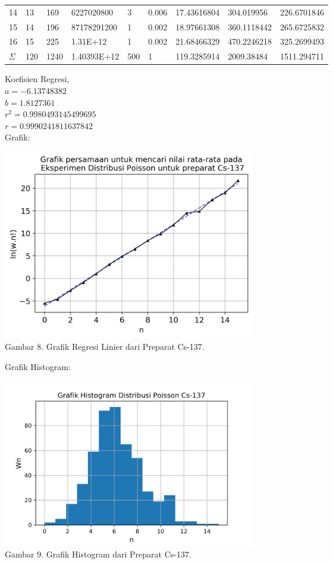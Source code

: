 \documentclass{article}
\begin{document}
\begin{longtable}{@{}lllllllll@{}}
				14  & 13  & 169                  & 6227020800  & 3   & 0.006 & 17.43616804  & 304.019956                  & 226.6701846  \\
				15  & 14  & 196                  & 87178291200 & 1   & 0.002 & 18.97661308  & 360.1118442                 & 265.6725832  \\
				16  & 15  & 225                  & 1.31E+12    & 1   & 0.002 & 21.68466329  & 470.2246218                 & 325.2699493  \\* \midrule
				$\Sigma$ & 120 & 1240                 & 1.40393E+12 & 500 & 1     & 119.3285914  & 2009.38484                  & 1511.294711  \\* \bottomrule
			\end{longtable}
			\hspace{-0.6cm}Koefisien Regresi, \\
			$a = -6.13748382$ \\
			$b = 1.8127361$ \\
			$r^{2} = 0.9980493145499695$ \\
			$r = 0.9990241811637842$ \\ \newpage
			Grafik: 
			\begin{center}
				\includegraphics[width=110mm]{Data/Cs-137-Graph.png}\\
				Gambar 8. Grafik Regresi Linier dari Preparat Cs-137.
			\end{center}
			Grafik Histogram:
			\begin{center}
				\includegraphics[width=110mm]{Data/Cs-137.png}\\
				Gambar 9. Grafik Histogram dari Preparat Cs-137.
			\end{center} 
\end{document}
